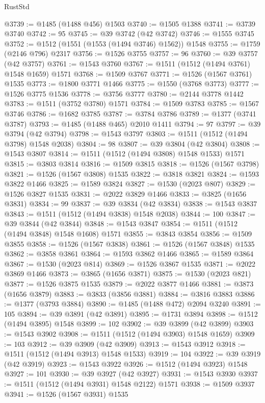 \begin{lexlean}{RustStd}
\begin{coremodule}
{{@3739 := @1485 (@1488 @456) @1503
@3740 := @1505 @1388
@3741 := @3739 @3740
@3742 := 95
@3745 := @39 @3742 (@42 @3742)
@3746 := @1555 @3745
@3752 := @1512 (@1551 (@1553 (@1494 @3746) @1562)) @1548
@3755 := @1759 (@2146 @796) @2317
@3756 := @1526 @3755
@3757 := 96
@3760 := @39 @3757 (@42 @3757)
@3761 := @1543 @3760
@3767 := @1511 (@1512 (@1494 @3761) @1548 @1659) @1571
@3768 := @1509 @3767
@3771 := @1526 (@1567 @3761) @1535
@3773 := @1800 @3771 @1466
@3775 := @1550 (@3768 @3773)
@3777 := @1526 @3775 @1536
@3778 := @3756 @3777
@3780 := @2144 @3778 @1442
@3783 := @1511 (@3752 @3780) @1571
@3784 := @1509 @3783
@3785 := @1567 @3746
@3786 := @1682 @3785
@3787 := @3784 @3786
@3789 := @1377 (@3741 @3787)
@3793 := @1485 (@1488 @465) @2010 @1411
@3794 := 97
@3797 := @39 @3794 (@42 @3794)
@3798 := @1543 @3797
@3803 := @1511 (@1512 (@1494 @3798) @1548 @2038)
@3804 := 98
@3807 := @39 @3804 (@42 @3804)
@3808 := @1543 @3807
@3814 := @1511 (@1512 (@1494 @3808) @1548 @1533) @1571
@3815 := @3803 @3814
@3816 := @1509 @3815
@3818 := @1526 (@1567 @3798)
@3821 := @1526 (@1567 @3808) @1535
@3822 := @3818 @3821
@3824 := @1593 @3822 @1466
@3825 := @1589 @3824
@3827 := @1530 (@2023 @807)
@3829 := @1526 @3827 @1535
@3831 := @2022 @3829 @1466
@3833 := @3825 (@1656 @3831)
@3834 := 99
@3837 := @39 @3834 (@42 @3834)
@3838 := @1543 @3837
@3843 := @1511 (@1512 (@1494 @3838) @1548 @2038)
@3844 := 100
@3847 := @39 @3844 (@42 @3844)
@3848 := @1543 @3847
@3854 := @1511 (@1512 (@1494 @3848) @1548 @1608) @1571
@3855 := @3843 @3854
@3856 := @1509 @3855
@3858 := @1526 (@1567 @3838)
@3861 := @1526 (@1567 @3848) @1535
@3862 := @3858 @3861
@3864 := @1593 @3862 @1466
@3865 := @1589 @3864
@3867 := @1530 (@2023 @814)
@3869 := @1526 @3867 @1535
@3871 := @2022 @3869 @1466
@3873 := @3865 (@1656 @3871)
@3875 := @1530 (@2023 @821)
@3877 := @1526 @3875 @1535
@3879 := @2022 @3877 @1466
@3881 := @3873 (@1656 @3879)
@3883 := @3833 (@3856 @3881)
@3884 := @3816 @3883
@3886 := @1377 (@3793 @3884)
@3890 := @1485 (@1488 @472) @2094 @3240
@3891 := 105
@3894 := @39 @3891 (@42 @3891)
@3895 := @1731 @3894
@3898 := @1512 (@1494 @3895) @1548
@3899 := 102
@3902 := @39 @3899 (@42 @3899)
@3903 := @1543 @3902
@3908 := @1511 (@1512 (@1494 @3903) @1548 @1659)
@3909 := 103
@3912 := @39 @3909 (@42 @3909)
@3913 := @1543 @3912
@3918 := @1511 (@1512 (@1494 @3913) @1548 @1533)
@3919 := 104
@3922 := @39 @3919 (@42 @3919)
@3923 := @1543 @3922
@3926 := @1512 (@1494 @3923) @1548
@3927 := 101
@3930 := @39 @3927 (@42 @3927)
@3931 := @1543 @3930
@3937 := @1511 (@1512 (@1494 @3931) @1548 @2122) @1571
@3938 := @1509 @3937
@3941 := @1526 (@1567 @3931) @1535
}}
\end{coremodule}
\end{lexlean}
